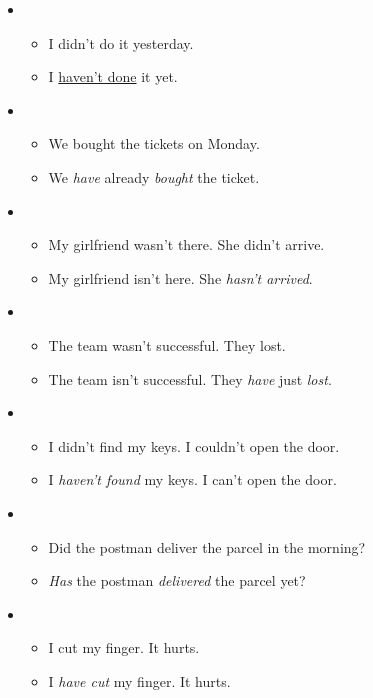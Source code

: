 \begin{itemize}

\item
\begin{itemize}
\item I didn't do it yesterday.
\item I \underline{haven't done} it yet.
\end{itemize}

\item
\begin{itemize}
\item We bought the tickets on Monday.
\item We \textit{have} already \textit{bought} the ticket.
\end{itemize}

\item
\begin{itemize}
\item My girlfriend wasn't there. She didn't arrive.
\item My girlfriend isn't here. She \textit{hasn't arrived}.
\end{itemize}

\item
\begin{itemize}
\item The team wasn't successful. They lost.
\item The team isn't successful. They \textit{have} just \textit{lost}.
\end{itemize}

\item
\begin{itemize}
\item I didn't find my keys. I couldn't open the door.
\item I \textit{haven't found} my keys. I can't open the door.
\end{itemize}

\item
\begin{itemize}
\item Did the postman deliver the parcel in the morning?
\item \textit{Has} the postman \textit{delivered} the parcel yet?
\end{itemize}

\item
\begin{itemize}
\item I cut my finger. It hurts.
\item I \textit{have cut} my finger. It hurts.
\end{itemize}


\end{itemize}
